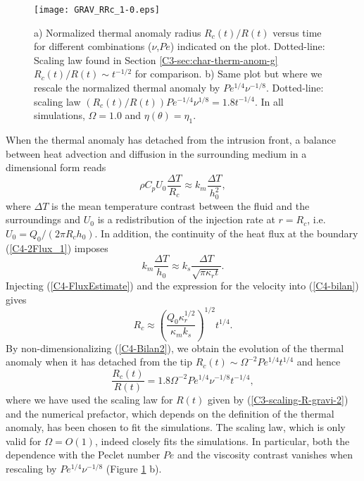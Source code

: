 \begin{figure}[h!]
  \begin{center}
    \graphicspath{ {/Users/thorey/Documents/These/Projet/Refroidissement/Skin_Model/Figure/Figure_Heating/} }
    \texttt{[image: GRAV\_RRc\_1-0.eps]}
    \caption{a) Normalized thermal anomaly radius $R_c(t)/R(t)$ versus
      time for  different combinations  ($\nu$,$Pe$) indicated  on the
      plot.     Dotted-line:   Scaling    law    found   in    Section
      \ref{C3-sec:char-therm-anom-g}  $R_c(t)/R(t)\sim  t^{-1/2}$  for
      comparison.  b)  Same plot but  where we rescale  the normalized
      thermal anomaly  by $Pe^{1/4}\nu^{-1/8}$.   Dotted-line: scaling
      law  $(R_c(t)/R(t))Pe^{-1/4}\nu^{1/8}=   1.8t^{-1/4}$.   In  all
      simulations, $\Omega=1.0$ and $\eta(\theta)=\eta_1$.}
    \label{C4-GRAV_RRc_RArrhenius_1-0}
  \end{center}
\end{figure}

When  the thermal  anomaly has  detached from  the intrusion  front, a
balance between heat advection and diffusion in the surrounding medium
in a dimensional form reads
\begin{equation}
  \rho C_p U_0 \frac{\Delta T}{R_c} \approx k_m \frac{\Delta T}{h_0^2},
  \label{C4-bilan}
\end{equation}
where $\Delta  T$ is the  mean temperature contrast between  the fluid
and the  surroundings and $U_0$  is a redistribution of  the injection
rate at  $r=R_c$, i.e.   $U_0=Q_0/(2\pi R_c  h_0)$.  In  addition, the
continuity of the heat flux at the boundary (\ref{C4-2Flux_1}) imposes
\begin{equation}
  k_m\frac{\Delta   T}{h_0}\approx   k_s   \frac{\Delta   T}{\sqrt{\pi
      \kappa_r t}}.
  \label{C4-FluxEstimate}
\end{equation}
Injecting (\ref{C4-FluxEstimate}) and the  expression for the velocity
into (\ref{C4-bilan}) gives
\begin{equation}
  R_c \approx  \left(\frac{Q_0\kappa_r^{1/2}}{\kappa_m k_s}\right)^{1/2}
  t^{1/4}.
  \label{C4-Bilan2}
\end{equation}
By non-dimensionalizing (\ref{C4-Bilan2}), we  obtain the evolution of
the   thermal   anomaly   when   it  has   detached   from   the   tip
$R_c(t)\sim \Omega^{-2}Pe^{1/4}t^{1/4}$ and hence
\begin{equation}
  \frac{R_c(t)}{R(t)} = 1.8\Omega^{-2}Pe^{1/4}\nu^{-1/8}t^{-1/4},
  \label{C4-Rc}
\end{equation}
where   we  have   used  the   scaling   law  for   $R(t)$  given   by
(\ref{C3-scaling-R-gravi-2})  and   the  numerical   prefactor,  which
depends on the  definition of the thermal anomaly, has  been chosen to
fit  the  simulations.  The  scaling  law,  which  is only  valid  for
$\Omega = O(1)$,  indeed closely fits the  simulations. In particular,
both  the dependence  with the  Peclet number  $Pe$ and  the viscosity
contrast  vanishes  when  rescaling  by  $Pe^{1/4}\nu^{-1/8}$  (Figure
\ref{C4-GRAV_RRc_RArrhenius_1-0} b).

